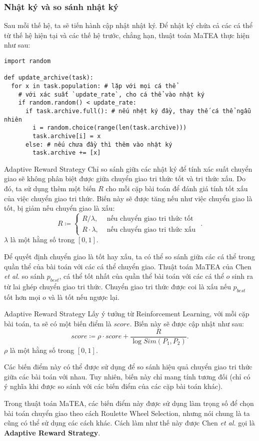 \begin{frame}[fragile]
\frametitle{Nhật ký và so sánh nhật ký}
  Sau mỗi thế hệ, ta sẽ tiến hành cập nhật nhật ký. Để nhật ký chứa cả các cá
  thể từ thế hệ hiện tại và các thế hệ trước, chẳng hạn, thuật toán MaTEA thực
  hiện như sau:
  \begin{verbatim}
import random

def update_archive(task):
  for x in task.population: # lặp với mọi cá thể
    # với xác suất `update_rate`, cho cá thể vào nhật ký
    if random.random() < update_rate: 
      if task.archive.full(): # nếu nhệt ký đầy, thay thế cá thể ngẫu nhiên
        i = random.choice(range(len(task.archive)))
        task.archive[i] = x
      else: # nếu chưa đầy thì thêm vào nhật ký
        task.archive += [x]
  \end{verbatim}
\end{frame}
\begin{frame}{Adaptive Reward Strategy}
  Chỉ so sánh giữa các nhật ký để tính xác suất chuyển giao sẽ không phân biệt
  được giữa chuyển giao tri thức tốt và tri thức xấu. Do đó, ta sử dụng thêm một
  biến \( R \) cho mỗi cặp bài toán để đánh giá tính tốt xấu của việc chuyển
  giao tri thức. Biến này sẽ được tăng nếu như việc chuyển giao là tốt, bị giảm
  nếu chuyển giao là xấu:
  \[
    R \coloneqq \begin{cases}
      R / \lambda, &\text{ nếu chuyển giao tri thức tốt } \\
      R \cdot \lambda, &\text{ nếu chuyển giao tri thức xấu }
    \end{cases}
  .\] 
  \( \lambda \) là một hằng số trong \( [0, 1] \).

  Để quyết định chuyển giao là tốt hay xấu, ta có thể so sánh giữa các cá thể
  trong quần thể của bài toán với các cá thể chuyển giao. Thuật toán MaTEA của
  Chen \textit{et al.} so sánh \( p_{best} \), cá thể tốt nhất của quần thể bài
  toán với các cá thể \( o \) sinh ra từ lai ghép chuyển giao tri thức. Chuyển
  giao tri thức được coi là xấu nếu \( p_{best} \) tốt hơn mọi \( o \) và là tốt
  nếu ngược lại.
\end{frame}

\begin{frame}{Adaptive Reward Strategy}
  Lấy ý tưởng từ Reinforcement Learning, với mỗi cặp bài toán, ta sẽ có một biến
  điểm là \( score \). Biến này sẽ được cập nhật như sau:
  \[
    score \coloneqq \rho \cdot score + \frac{R}{\log Sim(P_{1}, P_{2})}
  .\] 
  \( \rho \) là một hằng số trong \( [0, 1] \).

  Các biến điểm này có thể được sử dụng để so sánh hiệu quả chuyển giao tri thức
  giữa các bài toán với nhau. Tuy nhiên, biến này chỉ mang tính tương đối (chỉ
  có ý nghĩa khi được so sánh với các biến điểm của các cặp bài toán khác).

  Trong thuật toán MaTEA, các biến điểm này được sử dụng làm trọng số để chọn
  bài toán chuyển giao theo cách Roulette Wheel Selection, nhưng nói chung là
  ta cũng có thể sử dụng các cách khác. Cách làm như thế này được Chen
  \textit{et al.} gọi là \textbf{Adaptive Reward Strategy}.
\end{frame}

